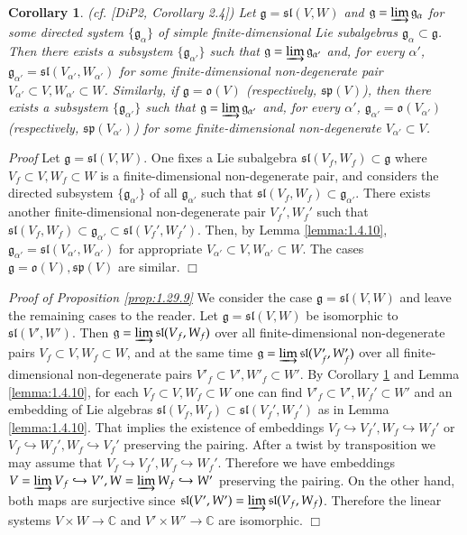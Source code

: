 \documentclass{svmult}
\newtheorem{cor}[theo]{Corollary}
\renewenvironment{proof}{ \emph{Proof}}{$\Box$}
\newcommand {\CC} {\mathbb {C}}
\renewcommand{\sp}{\mathfrak{sp}}
\renewcommand{\sl}{\mathfrak{sl}}
\newcommand{\oo}{\mathfrak{o}}
\renewcommand{\gg}{\mathfrak{g}}
\begin{document}
\begin{cor}\label{standardex}(cf. [DiP2, Corollary 2.4]) Let $\gg = \sl(V,W)$ and $\gg=\varinjlim \gg_\alpha$ for some directed system
$\{\gg_{\alpha}\}$ of simple finite-dimensional Lie subalgebras
  $\gg_\alpha \subset \gg$. Then there exists a subsystem 
$\{\gg_{\alpha'}\}$ such that
$\gg=\varinjlim \gg_{\alpha'}$ and, for every $\alpha'$,
  $\gg_{\alpha'}=\sl (V_{\alpha'},W_{\alpha'})$ 
for some finite-dimensional non-degenerate pair 
$V_{\alpha'}\subset V,W_{\alpha'}\subset W$. Similarly, if  $\gg =
\oo(V)$ 
(respectively, $\sp(V)$), then 
there exists a subsystem $\{\gg_{\alpha'}\}$ such that
$\gg=\varinjlim \gg_{\alpha'}$ and, for every $\alpha'$, $\gg_{\alpha'}=\oo (V_{\alpha'})$ 
(respectively, $\sp(V_{\alpha'})$) for some finite-dimensional non-degenerate
$V_{\alpha'}\subset V$.
\end{cor}

\begin{proof}
 Let $\gg = \sl(V,W)$. One fixes a Lie subalgebra $\sl(V_f,W_f) \subset \gg$ where $V_f \subset V, W_f \subset W$ is a finite-dimensional non-degenerate pair, and considers the directed subsystem $\{\gg_{\alpha'}\}$ of all $\gg_{\alpha'}$ such that $\sl(V_f, W_f) \subset \gg_{\alpha'}$. There exists another finite-dimensional non-degenerate pair $V_f',W_f'$ such that $\sl(V_f,W_f)\subset \gg_{\alpha'}\subset \sl(V_f',W_f')$. Then, by Lemma \ref{lemma:1.4.10}, $\gg_{\alpha'} = \sl(V_{\alpha'},W_{\alpha'})$ for appropriate $V_{\alpha'} \subset V, W_{\alpha'} \subset W$. The cases $\gg = \oo(V), \sp(V)$ are similar.
\end{proof}

\vspace{0.33cm}

\begin{proof}\textit{ of Proposition \ref{prop:1.29.9}}
We consider the case $\gg = \sl(V,W)$ and leave the remaining cases to
the reader. Let $\gg=\sl(V,W)$ be isomorphic to 
$\sl(V',W')$. Then $\gg=\varinjlim \sl(V_f,W_f)$ over all finite-dimensional 
non-degenerate pairs $V_f\subset V, W_f\subset W$, and at the same
time $\gg=\varinjlim\sl(V'_f,W'_f)$ 
over all finite-dimensional 
non-degenerate pairs $V'_f\subset V', W'_f\subset W'$. By Corollary \ref{standardex} and Lemma \ref{lemma:1.4.10}, for each $V_f\subset V,W_f\subset W$ one can 
find $V'_f\subset V',W_f'\subset W'$ and an embedding of Lie algebras
$\sl(V_f,W_f)\subset\sl(V_f',W_f')$ 
as in Lemma \ref{lemma:1.4.10}. That implies
the existence of embeddings $V_f\hookrightarrow V_f',
W_f\hookrightarrow W_f'$ or  
$V_f\hookrightarrow W_f', W_f\hookrightarrow V_f'$ preserving the pairing. After 
a twist by transposition we may 
assume that $V_f\hookrightarrow V_f', W_f\hookrightarrow
W_f'$. Therefore we have embeddings 
$V=\varinjlim V_f\hookrightarrow V', W=\varinjlim W_f\hookrightarrow W'$ preserving the pairing. 
On the other hand, both maps are surjective since
$\sl(V',W')=\varinjlim\sl(V_f,W_f)$. 
Therefore  the linear systems $V\times W\rightarrow \CC$ and 
$V' \times W' \rightarrow \CC$ are isomorphic.
\end{proof}
\end{document}
